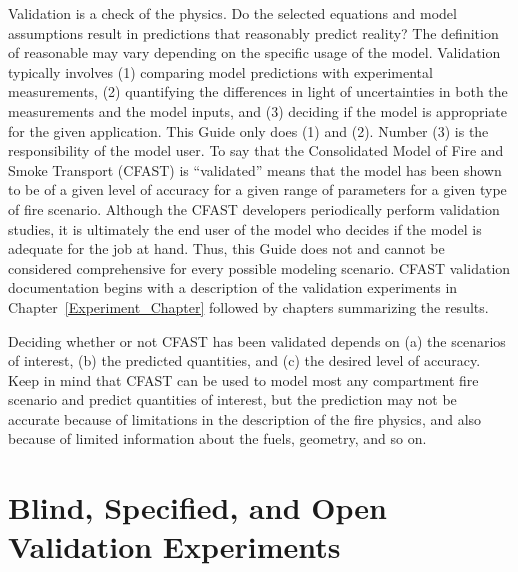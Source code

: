 Validation is a check of the physics. Do the selected equations and model assumptions result in predictions that reasonably predict reality? The definition of reasonable may vary depending on the specific usage of the model. Validation typically involves (1) comparing model predictions with experimental measurements, (2) quantifying the differences in light of uncertainties in both the measurements and the model inputs, and (3) deciding if the model is appropriate for the given application. This Guide only does (1) and (2). Number (3) is the responsibility of the model user. To say that the Consolidated Model of Fire and Smoke Transport (CFAST) is ``validated'' means that the model has been shown to be of a given level of accuracy for a given range of parameters for a given type of fire scenario. Although the CFAST developers periodically perform validation studies, it is ultimately the end user of the model who decides if the model is adequate for the job at hand. Thus, this Guide does not and cannot be considered comprehensive for every possible modeling scenario. CFAST validation documentation begins with a description of the validation experiments in Chapter~\ref{Experiment_Chapter} followed by chapters summarizing the results.

Deciding whether or not CFAST has been validated depends on (a) the scenarios of interest, (b) the predicted quantities, and (c) the desired level of accuracy. Keep in mind that CFAST can be used to model most any compartment fire scenario and predict quantities of interest, but the prediction may not be accurate because of limitations in the description of the fire physics, and also because of limited information about the fuels, geometry, and so on.


\section{Blind, Specified, and Open Validation Experiments}

